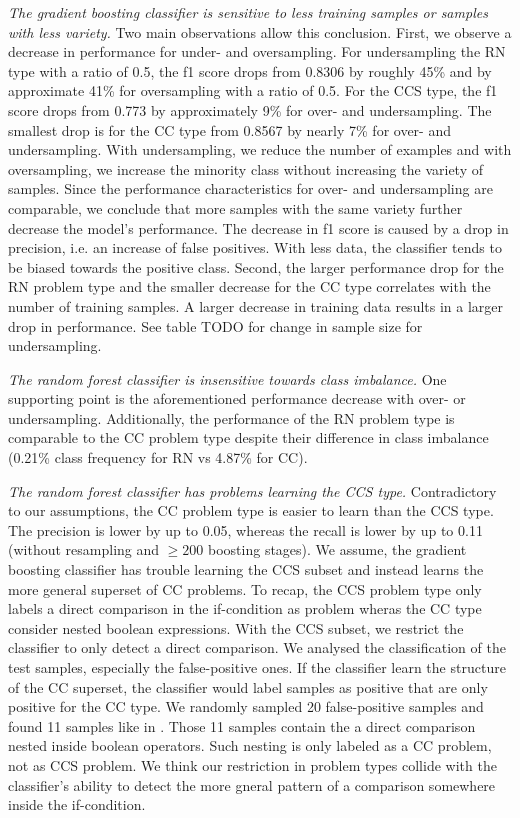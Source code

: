 \textit{The gradient boosting classifier is sensitive to less training samples or samples with less variety.} Two main observations allow this conclusion. First, we observe a decrease in performance for under- and oversampling. For undersampling the RN type with a ratio of 0.5, the f1 score drops from 0.8306 by roughly 45\% and by approximate 41\% for oversampling with a ratio of 0.5. For the CCS type, the f1 score drops from 0.773 by approximately 9\% for over- and undersampling. The smallest drop is for the CC type from 0.8567 by nearly 7\% for over- and undersampling. With undersampling, we reduce the number of examples and with oversampling, we increase the minority class without increasing the variety of samples. Since the performance characteristics for over- and undersampling are comparable, we conclude that more samples with the same variety further decrease the model's performance. The decrease in f1 score is caused by a drop in precision, i.e. an increase of false positives. With less data, the classifier tends to be biased towards the positive class.
Second, the larger performance drop for the RN problem type and the smaller decrease for the CC type correlates with the number of training samples. A larger decrease in training data results in a larger drop in performance. See table TODO for change in sample size for undersampling. 

\textit{The random forest classifier is insensitive towards class imbalance.} One supporting point is the aforementioned performance decrease with over- or undersampling. Additionally, the performance of the RN problem type is comparable to the CC problem type despite their difference in class imbalance (0.21\% class frequency for RN vs 4.87\% for CC). 

\textit{The random forest classifier has problems learning the CCS type.} Contradictory to our assumptions, the CC problem type is easier to learn than the CCS type. The precision is lower by up to 0.05, whereas the recall is lower by up to 0.11 (without resampling and $\geq 200$ boosting stages). We assume, the gradient boosting classifier has trouble learning the CCS subset and instead learns the more general superset of CC problems. To recap, the CCS problem type only labels a direct comparison in the if-condition as problem wheras the CC type consider nested boolean expressions. 
With the CCS subset, we restrict the classifier to only detect a direct comparison. We analysed the classification of the test samples, especially the false-positive ones. If the classifier learn the structure of the CC superset, the classifier would label samples as positive that are only positive for the CC type. We randomly sampled 20 false-positive samples and found 11 samples like in . Those 11 samples contain the a direct comparison nested inside boolean operators. Such nesting is only labeled as a CC problem, not as CCS problem. We think our restriction in problem types collide with the classifier's ability to detect the more gneral pattern of a comparison somewhere inside the if-condition.


